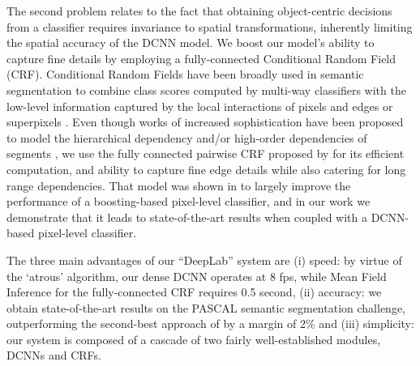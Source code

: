 The second problem relates to the fact that obtaining object-centric decisions
from a classifier requires invariance to spatial transformations,
inherently limiting the spatial accuracy of the DCNN model. We boost
our model's ability to capture fine details by employing a
fully-connected Conditional Random Field (CRF). Conditional Random
Fields have been broadly used in semantic segmentation to 
combine class scores computed by multi-way classifiers with the low-level
information captured by the local interactions of pixels and edges
\citep{rother2004grabcut, shotton2009textonboost} or superpixels
\citep{lucchi2011spatial}. Even though works of increased sophistication have
been proposed to model the hierarchical dependency \citep{he2004multiscale,
  ladicky2009associative, lempitsky2011pylon} and/or high-order dependencies
of segments \citep{delong2012fast, gonfaus2010harmony, kohli2009robust, CPY13}, we
use the fully connected pairwise CRF proposed by
\citet{krahenbuhl2011efficient} for its efficient computation, and ability to
capture fine edge details while also catering for long range dependencies. That model was shown in
\citet{krahenbuhl2011efficient} to largely improve the performance of a
boosting-based pixel-level classifier, and in our work we demonstrate that it
leads to state-of-the-art results when coupled with a DCNN-based pixel-level
classifier.


The three main advantages of our ``DeepLab'' system are (i) speed: by
virtue of the `atrous' algorithm, our dense DCNN operates at 8 fps,
while Mean Field Inference for the fully-connected CRF requires 0.5
second, (ii) accuracy: we obtain state-of-the-art results on the
PASCAL semantic segmentation challenge, outperforming the second-best
approach of \citet{mostajabi2014feedforward} by a margin of 2$\%$ and
(iii) simplicity: our system is composed of a cascade of two fairly
well-established modules, DCNNs and CRFs.


